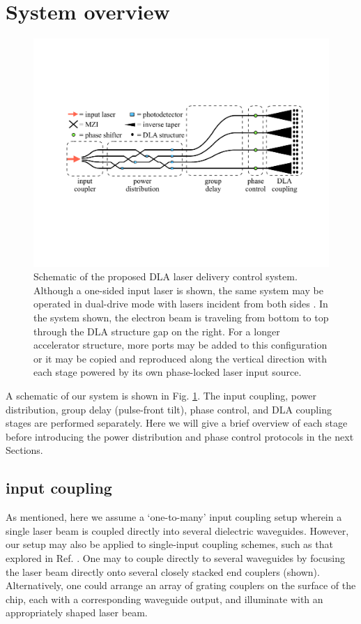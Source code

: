 \documentclass[%
 reprint,
 amsmath,amssymb,
 aps,
prstab,
floatfix,
]{revtex4-1}
\begin{document}
\section{\label{sec:system}System overview}

\begin{figure}
\includegraphics[width=1\columnwidth]{setup}
\caption{\label{fig:setup} Schematic of the proposed DLA laser delivery control system.  Although a one-sided input laser is shown, the same system may be operated in dual-drive mode with lasers incident from both sides \cite{leedle_phase-dependent_2018}.  In the system shown, the electron beam is traveling from bottom to top through the DLA structure gap on the right.  For a longer accelerator structure, more ports may be added to this configuration or it may be copied and reproduced along the vertical direction with each stage powered by its own phase-locked laser input source.}
\end{figure}

A schematic of our system is shown in Fig. \ref{fig:setup}.  The input coupling, power distribution, group delay (pulse-front tilt), phase control, and DLA coupling stages are performed separately.  Here we will give a brief overview of each stage before introducing the power distribution and phase control protocols in the next Sections.

\subsection{input coupling}
As mentioned, here we assume a `one-to-many' input coupling setup wherein a single laser beam is coupled directly into several dielectric waveguides.  However, our setup may also be applied to single-input coupling schemes, such as that explored in Ref. \cite{hughes_-chip_2017}.  One may to couple directly to several waveguides by focusing the laser beam directly onto several closely stacked end couplers (shown).  Alternatively, one could arrange an array of grating couplers on the surface of the chip, each with a corresponding waveguide output, and illuminate with an appropriately shaped laser beam.
\end{document}
